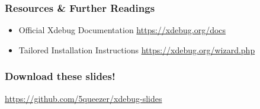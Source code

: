 \begin{frame}\frametitle{Resources \& Further Readings}
    \begin{itemize}
        \item Official Xdebug Documentation \href{https://xdebug.org/docs}{https://xdebug.org/docs}
        \item Tailored Installation Instructions \href{https://xdebug.org/wizard.php}{https://xdebug.org/wizard.php}
    \end{itemize}
\end{frame}

\begin{frame}\frametitle{Download these slides!}
    \centering
    
    \href{https://github.com/5queezer/xdebug-slides}{https://github.com/5queezer/xdebug-slides}
\end{frame}